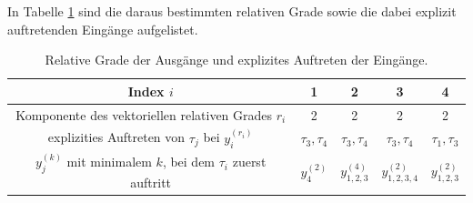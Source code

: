 In Tabelle \ref{tab:relative_degrees} sind die daraus bestimmten relativen Grade sowie die dabei explizit auftretenden Eingänge aufgelistet.
\begin{table}[htbp]%
	\centering
	\caption{Relative Grade der Ausgänge und explizites Auftreten der Eingänge.}
	\label{tab:relative_degrees}
	\begin{tabular}{c| c c c c} 
		\toprule
		Index $i$ & 1 & 2 & 3 & 4 \\ 
		\hline
		Komponente des vektoriellen relativen Grades $r_i$ & 2 & 2 & 2 & 2\\ 
		\hline
		explizities Auftreten von $\tau_j$ bei $y_i^{(r_i)}$ & $\tau_3, \tau_4$ & $\tau_3, \tau_4$ & $\tau_3, \tau_4$ & $\tau_1, \tau_3$ \\
		\hline
		$y_j^{(k)}$ mit minimalem $k$, bei dem $\tau_i$ zuerst auftritt & $y_4^{(2)}$ & $y_{1,2,3}^{(4)}$ & $y_{1,2,3,4}^{(2)}$ & $y_{1,2,3}^{(2)}$\\
		\bottomrule
	\end{tabular}
\end{table}


